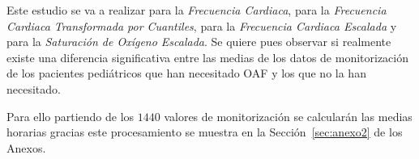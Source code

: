 Este estudio se va a realizar para la \textit{Frecuencia Cardiaca}, para la \textit{Frecuencia Cardiaca Transformada por Cuantiles}, para la \textit{Frecuencia Cardiaca Escalada} y para la \textit{Saturación de Oxígeno Escalada}. Se quiere pues observar si realmente existe una diferencia significativa entre las medias de los datos de monitorización de los pacientes pediátricos que han necesitado OAF y los que no la han necesitado.

Para ello partiendo de los $1440$ valores de monitorización se calcularán las medias horarias gracias este procesamiento se muestra en la Sección~\ref{sec:anexo2} de los Anexos.



